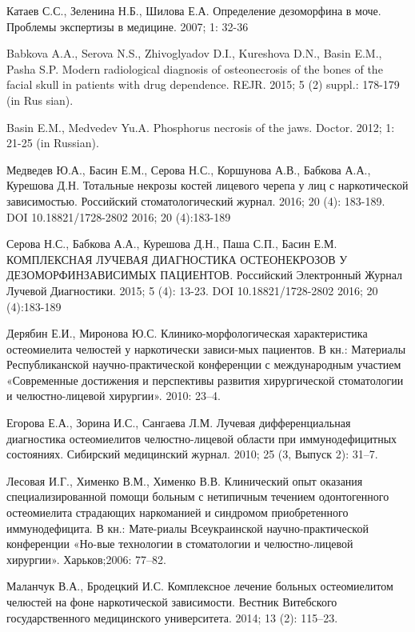 \documentclass[11pt]{article}
\begin{document}
	\begin{thebibliography}{3}
		 Катаев С.С., Зеленина Н.Б., Шилова Е.А. Определение	дезоморфина в моче. Проблемы экспертизы в медицине.	2007; 1: 32-36 

		 Babkova A.A., Serova N.S., Zhivoglyadov D.I., Kureshova D.N., Basin E.M., Pasha S.P. Modern radiological diagnosis of osteonecrosis of the bones of the facial skull in patients with drug dependence. REJR. 2015; 5 (2) suppl.: 178-179 (in Rus	sian).  
		
		 Basin E.M., Medvedev Yu.A. Phosphorus necrosis of the jaws. Doctor. 2012; 1: 21-25 (in Russian). 
		
		 Медведев Ю.А., Басин Е.М., Серова Н.С., Коршунова А.В., Бабкова А.А., Курешова Д.Н. Тотальные некрозы костей лицевого черепа у лиц с наркотической зависимостью. Российский стоматологический журнал. 2016; 20 (4): 183-189. DOI 10.18821/1728-2802 2016; 20 (4):183-189
		
		 Серова Н.С., Бабкова А.А., Курешова Д.Н., Паша С.П., Басин Е.М. КОМПЛЕКСНАЯ ЛУЧЕВАЯ ДИАГНОСТИКА ОСТЕОНЕКРОЗОВ У ДЕЗОМОРФИНЗАВИСИМЫХ ПАЦИЕНТОВ. Российский Электронный Журнал Лучевой Диагностики. 2015; 5 (4): 13-23. DOI 10.18821/1728-2802 2016; 20 (4):183-189
			
		   Дерябин  Е.И.,  Миронова  Ю.С.  Клинико-морфологическая  характеристика  остеомиелита  челюстей  у  наркотически  зависи-мых  пациентов.  В  кн.: Материалы  Республиканской  научно-практической конференции с международным участием «Современные достижения и перспективы развития хирургической стоматологии и челюстно-лицевой хирургии». 2010: 23–4.
		
		   Егорова Е.А., Зорина И.С., Сангаева Л.М. Лучевая дифференциальная диагностика остеомиелитов челюстно-лицевой области при  иммунодефицитных  состояниях. Сибирский  медицинский журнал. 2010; 25 (3, Выпуск 2): 31–7.
		
		   Лесовая И.Г., Хименко В.М., Хименко В.В. Клинический опыт оказания специализированной помощи больным с нетипичным течением одонтогенного остеомиелита страдающих наркоманией и синдромом приобретенного иммунодефицита. В кн.: Мате-риалы Всеукраинской научно-практической конференции «Но-вые технологии в стоматологии и челюстно-лицевой хирургии». Харьков;2006: 77–82.
		
		   Маланчук В.А., Бродецкий И.С. Комплексное лечение больных остеомиелитом челюстей на фоне наркотической зависимости. Вестник Витебского государственного медицинского университета. 2014; 13 (2): 115–23.
		

\end{thebibliography}
\end{document}
